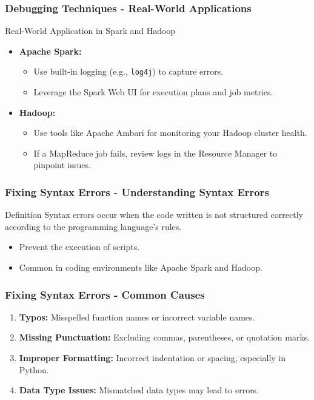 \documentclass[aspectratio=169]{beamer}
\begin{document}
\begin{frame}[fragile]
    \frametitle{Debugging Techniques - Real-World Applications}

    \begin{block}{Real-World Application in Spark and Hadoop}
        \begin{itemize}
            \item \textbf{Apache Spark:} 
            \begin{itemize}
                \item Use built-in logging (e.g., \texttt{log4j}) to capture errors.
                \item Leverage the Spark Web UI for execution plans and job metrics.
            \end{itemize}

            \item \textbf{Hadoop:} 
            \begin{itemize}
                \item Use tools like Apache Ambari for monitoring your Hadoop cluster health.
                \item If a MapReduce job fails, review logs in the Resource Manager to pinpoint issues.
            \end{itemize}
        \end{itemize}
    \end{block}
\end{frame}

\begin{frame}[fragile]
    \frametitle{Fixing Syntax Errors - Understanding Syntax Errors}
    \begin{block}{Definition}
        Syntax errors occur when the code written is not structured correctly according to the programming language's rules. 
    \end{block}
    \begin{itemize}
        \item Prevent the execution of scripts.
        \item Common in coding environments like Apache Spark and Hadoop.
    \end{itemize}
\end{frame}

\begin{frame}[fragile]
    \frametitle{Fixing Syntax Errors - Common Causes}
    \begin{enumerate}
        \item \textbf{Typos:} Misspelled function names or incorrect variable names.
        \item \textbf{Missing Punctuation:} Excluding commas, parentheses, or quotation marks.
        \item \textbf{Improper Formatting:} Incorrect indentation or spacing, especially in Python.
        \item \textbf{Data Type Issues:} Mismatched data types may lead to errors.
    \end{enumerate}
\end{frame}
\end{document}
